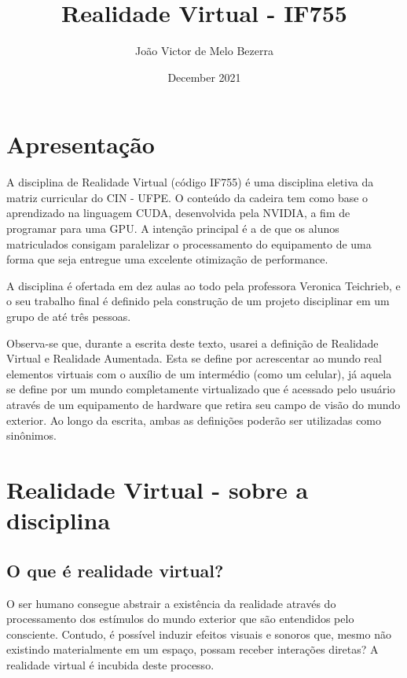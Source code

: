 \documentclass[a4paper, 12pt]{article}
\title{Realidade Virtual - IF755}
\author{João Victor de Melo Bezerra}
\date{December 2021}
\begin{document}
\maketitle

\section{Apresentação}
A disciplina de Realidade Virtual (código IF755) é uma disciplina eletiva da matriz curricular do CIN - UFPE. O conteúdo da cadeira tem como base o aprendizado na linguagem CUDA, desenvolvida pela NVIDIA, a fim de programar para uma GPU. A intenção principal é a de que os alunos matriculados consigam paralelizar o processamento do equipamento de uma forma que seja entregue uma excelente otimização de performance.

A disciplina é ofertada em dez aulas ao todo pela professora Veronica Teichrieb, e o seu trabalho final é definido pela construção de um projeto disciplinar em um grupo de até três pessoas.

Observa-se que, durante a escrita deste texto, usarei a definição de Realidade Virtual e Realidade Aumentada. Esta se define por acrescentar ao mundo real elementos virtuais com o auxílio de um intermédio (como um celular), já aquela se define por um mundo completamente virtualizado que é acessado pelo usuário através de um equipamento de hardware que retira seu campo de visão do mundo exterior. Ao longo da escrita, ambas as definições poderão ser utilizadas como sinônimos.

\section{Realidade Virtual - sobre a disciplina}
\subsection{O que é realidade virtual?}
O ser humano consegue abstrair a existência da realidade através do processamento dos estímulos do mundo exterior que são entendidos pelo consciente. Contudo, é possível induzir efeitos visuais e sonoros que, mesmo não existindo materialmente em um espaço, possam receber interações diretas? A realidade virtual é incubida deste processo.
\end{document}
